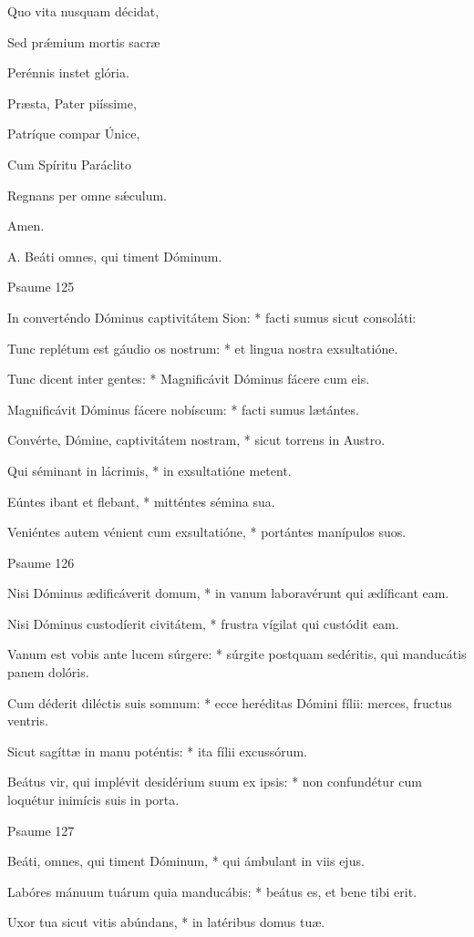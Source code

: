 Quo vita nusquam décidat,

Sed prǽmium mortis sacræ

Perénnis instet glória.


Præsta, Pater piíssime,

Patríque compar Únice,

Cum Spíritu Paráclito

Regnans per omne sǽculum.

Amen.


A. Beáti omnes, qui timent Dóminum.


Psaume 125

In converténdo Dóminus captivitátem Sion: * facti sumus sicut consoláti:

Tunc replétum est gáudio os nostrum: * et lingua nostra exsultatióne.

Tunc dicent inter gentes: * Magnificávit Dóminus fácere cum eis.

Magnificávit Dóminus fácere nobíscum: * facti sumus lætántes.

Convérte, Dómine, captivitátem nostram, * sicut torrens in Austro.

Qui séminant in lácrimis, * in exsultatióne metent.

Eúntes ibant et flebant, * mitténtes sémina sua.

Veniéntes autem vénient cum exsultatióne, * portántes manípulos suos.


Psaume 126

Nisi Dóminus ædificáverit domum, * in vanum laboravérunt qui ædíficant eam.

Nisi Dóminus custodíerit civitátem, * frustra vígilat qui custódit eam.

Vanum est vobis ante lucem súrgere: * súrgite postquam sedéritis, qui manducátis panem dolóris.

Cum déderit diléctis suis somnum: * ecce heréditas Dómini fílii: merces, fructus ventris.

Sicut sagíttæ in manu poténtis: * ita fílii excussórum.

Beátus vir, qui implévit desidérium suum ex ipsis: * non confundétur cum loquétur inimícis suis in porta.


Psaume 127

Beáti, omnes, qui timent Dóminum, * qui ámbulant in viis ejus.

Labóres mánuum tuárum quia manducábis: * beátus es, et bene tibi erit.

Uxor tua sicut vitis abúndans, * in latéribus domus tuæ.

